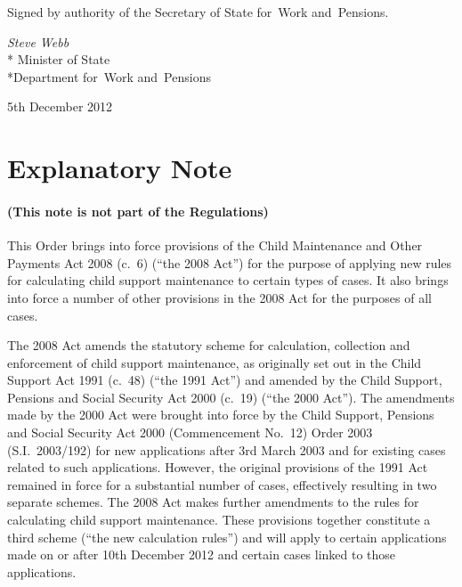 \documentclass[12pt,a4paper]{article}
\begin{document}
\bigskip

\pagebreak[3]

Signed 
by authority of the 
Secretary of State for~Work and~Pensions.

{\raggedleft
\emph{Steve Webb}\\*
Minister
of State\\*Department 
for~Work and~Pensions

}

5th December 2012

\small

\part{Explanatory Note}

\renewcommand\parthead{— Explanatory Note}

\subsection*{(This note is not part of the Regulations)}

This Order brings into force provisions of the Child Maintenance and Other Payments Act 2008 (c.~6) (“the 2008 Act”) for the purpose of applying new rules for calculating child support maintenance to certain types of cases. It also brings into force a number of other provisions in the 2008 Act for the purposes of all cases.

The 2008 Act amends the statutory scheme for calculation, collection and enforcement of child support maintenance, as originally set out in the Child Support Act 1991 (c.~48) (“the 1991 Act”) and amended by the Child Support, Pensions and Social Security Act 2000 (c.~19) (“the 2000 Act”). The amendments made by the 2000 Act were brought into force by the Child Support, Pensions and Social Security Act 2000 (Commencement No.~12) Order 2003 (S.I.~2003/192) for new applications after 3rd March 2003 and for existing cases related to such applications. However, the original provisions of the 1991 Act remained in force for a substantial number of cases, effectively resulting in two separate schemes. The 2008 Act makes further amendments to the rules for calculating child support maintenance. These provisions together constitute a third scheme (“the new calculation rules”) and will apply to certain applications made on or after 10th December 2012 and certain cases linked to those applications.
\end{document}
